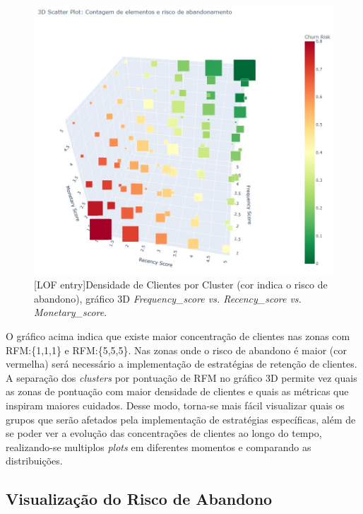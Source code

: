 \documentclass{easychair}
\begin{document}
\begin{figure}[H]
    \begin{centering}
    \includegraphics[width=1\linewidth]{imagens/figure31.jpg}\label{cap-5-fig31}
    [LOF entry]{Densidade de Clientes por Cluster (cor indica o risco de abandono), gráfico 3D \textit{Frequency_score vs. Recency_score vs. Monetary_score}.}
    \label{fig31}
    \end{centering}
\end{figure}

O gráfico acima indica que existe maior concentração de clientes nas zonas com RFM:\{1,1,1\} e RFM:\{5,5,5\}. Nas zonas onde o risco de abandono é maior (cor vermelha) será necessário a implementação de estratégias de retenção de clientes. A separação dos \textit{clusters} por pontuação de RFM no gráfico 3D permite vez quais as zonas de pontuação com maior densidade de clientes e quais as métricas que inspiram maiores cuidados. Desse modo, torna-se mais fácil visualizar quais os grupos que serão afetados pela implementação de estratégias específicas, além de se poder ver a evolução das concentrações de clientes ao longo do tempo, realizando-se multiplos \textit{plots} em diferentes momentos e comparando as distribuições.


\newpage
\subsection{Visualização do Risco de Abandono}
\end{document}
